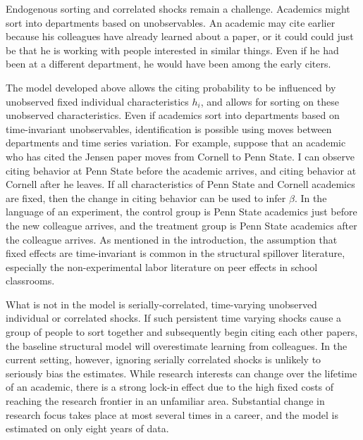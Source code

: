 Endogenous sorting and correlated shocks remain a challenge.  Academics might sort into 
departments based on unobservables. An academic may cite
earlier because his colleagues have already learned about a paper, or it
could could just be that he is working with people interested in
similar things. Even if he had been at a different department, he would
have been among the early citers.

\setcounter{footnote}{0}

The model developed above allows the citing probability to be influenced
by unobserved fixed individual characteristics $h_i$, and allows for
sorting on these unobserved characteristics. Even if academics sort into
departments based on time-invariant unobservables, identification is
possible using moves between departments and time series variation. For
example, suppose that an academic who has cited the Jensen paper moves from
Cornell to Penn State. I can observe citing behavior at Penn State
before the academic arrives, and
citing behavior at Cornell after he leaves. If all characteristics of
Penn State and Cornell academics are fixed, then the change in citing
behavior can be used to infer $\beta$. In the language of an experiment,
the control group is Penn State academics just before the new colleague
arrives, and the treatment group is Penn State academics after the
colleague arrives.  As mentioned in the introduction, the assumption that 
 fixed effects are time-invariant is common in the structural spillover literature,
 especially the non-experimental labor literature on peer
 effects in school classrooms.\citep{bettsa2004peer, arcidiacono2012estimating, burke2013classroom}\footnotemark{}

What is not in the model is serially-correlated, time-varying unobserved
individual or correlated shocks. If such persistent time varying shocks cause a group of people to
sort together and subsequently begin citing each other papers, the
baseline structural model will overestimate learning from colleagues.
In the current setting, however, ignoring serially correlated shocks is 
unlikely to seriously bias the estimates.  While research interests can
change over the lifetime of an academic, there is a strong lock-in effect
due to the high fixed costs of reaching the research frontier in an unfamiliar
area.  Substantial change in research focus takes place at most
several times in a career, and the model is estimated on only eight
years of data.

